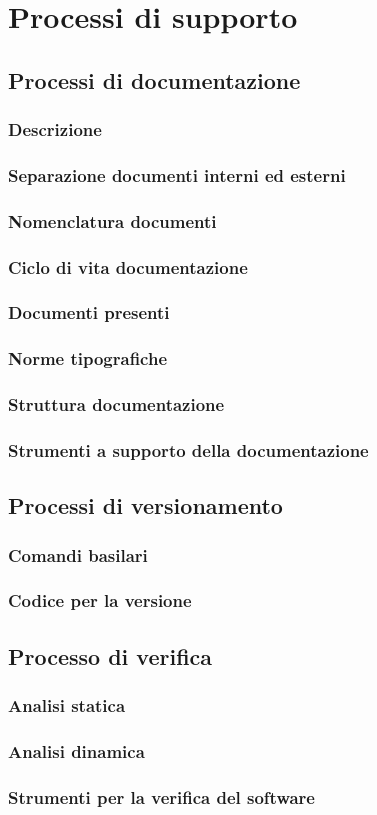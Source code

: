 \documentclass[NormeDiProgetto.tex]{subfiles}
\begin{document}
\chapter{Processi di supporto}

\section{Processi di documentazione}
\subsection{Descrizione}
\subsection{Separazione documenti interni ed esterni}
\subsection{Nomenclatura documenti}
\subsection{Ciclo di vita documentazione}
\subsection{Documenti presenti}
\subsection{Norme tipografiche}
\subsection{Struttura documentazione}
\subsection{Strumenti a supporto della documentazione}

\section{Processi di versionamento}
\subsection{Comandi basilari}
\subsection{Codice per la versione}

\section{Processo di verifica}
\subsection{Analisi statica}
\subsection{Analisi dinamica}
\subsection{Strumenti per la verifica del software}
\end{document}
